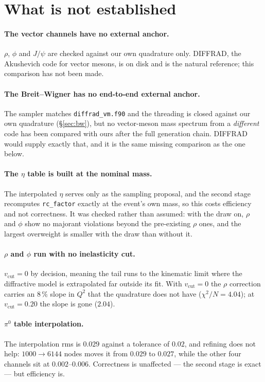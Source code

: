 \documentclass[11pt]{article}
\newcommand{\vcut}{v_{\mathrm{cut}}}
\newcommand{\code}[1]{\texttt{#1}}
\begin{document}
\section{What is not established}

\paragraph{The vector channels have no external anchor.} $\rho$, $\phi$ and
$J/\psi$ are checked against our own quadrature only. DIFFRAD, the
Akushevich code for vector mesons, is on disk and is the natural reference;
this comparison has not been made.

\paragraph{The Breit--Wigner has no end-to-end external anchor.} The sampler
matches \code{diffrad\_vm.f90} and the threading is closed against our own
quadrature (§\ref{sec:bw}), but no vector-meson mass spectrum from a
\emph{different} code has been compared with ours after the full generation
chain. DIFFRAD would supply exactly that, and it is the same missing
comparison as the one below.

\paragraph{The $\eta$ table is built at the nominal mass.} The interpolated
$\eta$ serves only as the sampling proposal, and the second stage recomputes
\code{rc\_factor} exactly at the event's own mass, so this costs efficiency
and not correctness. It was checked rather than assumed: with the draw on,
$\rho$ and $\phi$ show no majorant violations beyond the pre-existing $\rho$
ones, and the largest overweight is smaller with the draw than without it.

\paragraph{$\rho$ and $\phi$ run with no inelasticity cut.} $\vcut=0$ by
decision, meaning the tail runs to the kinematic limit where the diffractive
model is extrapolated far outside its fit. With $\vcut=0$ the $\rho$
correction carries an $8\,\%$ slope in $Q^2$ that the quadrature does not
have ($\chi^2/N=4.04$); at $\vcut=0.20$ the slope is gone ($2.04$).

\paragraph{$\pi^0$ table interpolation.} The interpolation rms is $0.029$
against a tolerance of $0.02$, and refining does not help: $1000\to6144$
nodes moves it from $0.029$ to $0.027$, while the other four channels sit at
$0.002$--$0.006$. Correctness is unaffected --- the second stage is exact ---
but efficiency is.
\end{document}
